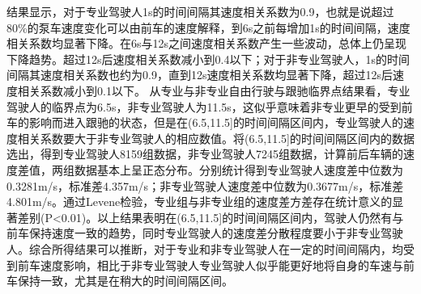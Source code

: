 结果显示，对于专业驾驶人1s的时间间隔其速度相关系数为0.9，也就是说超过80\%的泵车速度变化可以由前车的速度解释，到6s之前每增加1s的时间间隔，速度相关系数均显著下降。在6s与12s之间速度相关系数产生一些波动，总体上仍呈现下降趋势。超过12s后速度相关系数减小到0.4以下；对于非专业驾驶人，1s的时间间隔其速度相关系数也约为0.9，直到12s速度相关系数均显著下降，超过12s后速度相关系数减小到0.1以下。
从专业与非专业自由行驶与跟驰临界点结果看，专业驾驶人的临界点为6.5s，非专业驾驶人为11.5s，这似乎意味着非专业更早的受到前车的影响而进入跟驰的状态，但是在(6.5,11.5]的时间间隔区间内，专业驾驶人的速度相关系数要大于非专业驾驶人的相应数值。将(6.5,11.5]的时间间隔区间内的数据选出，得到专业驾驶人8159组数据，非专业驾驶人7245组数据，计算前后车辆的速度差值，两组数据基本上呈正态分布。分别统计得到专业驾驶人速度差中位数为0.3281m/s，标准差4.357m/s；非专业驾驶人速度差中位数为0.3677m/s，标准差4.801m/s。通过Levene检验，专业组与非专业组的速度差方差存在统计意义的显著差别(P<0.01)。以上结果表明在(6.5,11.5]的时间间隔区间内，驾驶人仍然有与前车保持速度一致的趋势，同时专业驾驶人的速度差分散程度要小于非专业驾驶人。综合所得结果可以推断，对于专业和非专业驾驶人在一定的时间间隔内，均受到前车速度影响，相比于非专业驾驶人专业驾驶人似乎能更好地将自身的车速与前车保持一致，尤其是在稍大的时间间隔区间。
